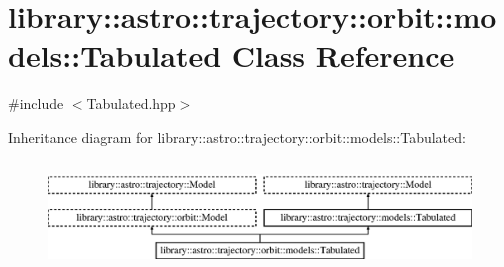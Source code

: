 \hypertarget{classlibrary_1_1astro_1_1trajectory_1_1orbit_1_1models_1_1_tabulated}{}\section{library\+:\+:astro\+:\+:trajectory\+:\+:orbit\+:\+:models\+:\+:Tabulated Class Reference}
\label{classlibrary_1_1astro_1_1trajectory_1_1orbit_1_1models_1_1_tabulated}


{\ttfamily \#include $<$Tabulated.\+hpp$>$}

Inheritance diagram for library\+:\+:astro\+:\+:trajectory\+:\+:orbit\+:\+:models\+:\+:Tabulated\+:\begin{figure}[H]
\begin{center}
\leavevmode
\includegraphics[height=2.916667cm]{classlibrary_1_1astro_1_1trajectory_1_1orbit_1_1models_1_1_tabulated}
\end{center}
\end{figure}
